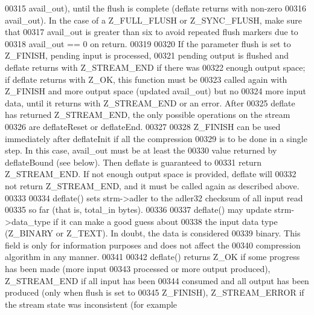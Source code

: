 \begin{DoxyCode}
00315 \textcolor{comment}{  avail\_out), until the flush is complete (deflate returns with non-zero}
00316 \textcolor{comment}{  avail\_out).  In the case of a Z\_FULL\_FLUSH or Z\_SYNC\_FLUSH, make sure that}
00317 \textcolor{comment}{  avail\_out is greater than six to avoid repeated flush markers due to}
00318 \textcolor{comment}{  avail\_out == 0 on return.}
00319 \textcolor{comment}{}
00320 \textcolor{comment}{    If the parameter flush is set to Z\_FINISH, pending input is processed,}
00321 \textcolor{comment}{  pending output is flushed and deflate returns with Z\_STREAM\_END if there was}
00322 \textcolor{comment}{  enough output space; if deflate returns with Z\_OK, this function must be}
00323 \textcolor{comment}{  called again with Z\_FINISH and more output space (updated avail\_out) but no}
00324 \textcolor{comment}{  more input data, until it returns with Z\_STREAM\_END or an error.  After}
00325 \textcolor{comment}{  deflate has returned Z\_STREAM\_END, the only possible operations on the stream}
00326 \textcolor{comment}{  are deflateReset or deflateEnd.}
00327 \textcolor{comment}{}
00328 \textcolor{comment}{    Z\_FINISH can be used immediately after deflateInit if all the compression}
00329 \textcolor{comment}{  is to be done in a single step.  In this case, avail\_out must be at least the}
00330 \textcolor{comment}{  value returned by deflateBound (see below).  Then deflate is guaranteed to}
00331 \textcolor{comment}{  return Z\_STREAM\_END.  If not enough output space is provided, deflate will}
00332 \textcolor{comment}{  not return Z\_STREAM\_END, and it must be called again as described above.}
00333 \textcolor{comment}{}
00334 \textcolor{comment}{    deflate() sets strm->adler to the adler32 checksum of all input read}
00335 \textcolor{comment}{  so far (that is, total\_in bytes).}
00336 \textcolor{comment}{}
00337 \textcolor{comment}{    deflate() may update strm->data\_type if it can make a good guess about}
00338 \textcolor{comment}{  the input data type (Z\_BINARY or Z\_TEXT).  In doubt, the data is considered}
00339 \textcolor{comment}{  binary.  This field is only for information purposes and does not affect the}
00340 \textcolor{comment}{  compression algorithm in any manner.}
00341 \textcolor{comment}{}
00342 \textcolor{comment}{    deflate() returns Z\_OK if some progress has been made (more input}
00343 \textcolor{comment}{  processed or more output produced), Z\_STREAM\_END if all input has been}
00344 \textcolor{comment}{  consumed and all output has been produced (only when flush is set to}
00345 \textcolor{comment}{  Z\_FINISH), Z\_STREAM\_ERROR if the stream state was inconsistent (for example}

\end{DoxyCode}
